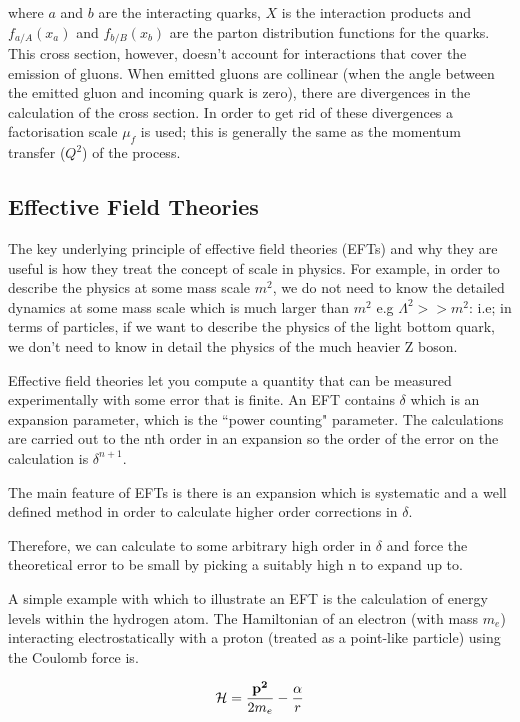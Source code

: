 \documentclass[11pt,oneside,a4paper]{article}
\begin{document}
where $a$ and $b$ are the interacting quarks, $X$ is the interaction products and $f_{a/A}(x_{a})$ and $f_{b/B}(x_{b})$ are the parton distribution functions for the quarks. This cross section, however, doesn't account for interactions that cover the emission of gluons. When emitted gluons are collinear (when the angle between the emitted gluon and incoming quark is zero), there are divergences in the calculation of the cross section. In order to get rid of these divergences a factorisation scale $\mu_{f}$ is used; this is generally the same as the momentum transfer ($Q^2$) of the process.


\subsection{Effective Field Theories}
The key underlying principle of effective field theories (EFTs) and why they are useful is how they treat the concept of scale in physics. For example, in order to describe the physics at some mass scale $m^2$, we do not need to know the detailed dynamics at some mass scale which is much larger than $m^2$ e.g $\Lambda^2>>m^2$: i.e; in terms of particles, if we want to describe the physics of the light bottom quark, we don't need to know in detail the physics of the much heavier Z boson.

Effective field theories let you compute a quantity that can be measured experimentally with some error that is finite. An EFT contains $\delta$ which is an expansion parameter, which is the ``power counting" parameter. The calculations are carried out to the nth order in an expansion so the order of the error on the calculation is $\delta^{n+1}$.

The main feature of EFTs is there is an expansion which is systematic and a well defined method in order to calculate higher order corrections in $\delta$. 

Therefore, we can calculate to some arbitrary high order in $\delta$ and force the theoretical error to be small by picking a suitably high n to expand up to.

A simple example with which to illustrate an EFT is the calculation of energy levels within the hydrogen atom. The Hamiltonian of an electron (with mass $m_{e}$) interacting electrostatically with a proton (treated as a point-like particle) using the Coulomb force is.

\begin{equation}
\label{eq:hydrogen}
\mathcal{H} = \frac{\bf{p^2}}{2m_{e}} - \frac{\alpha}{r}
\end{equation}
\end{document}
